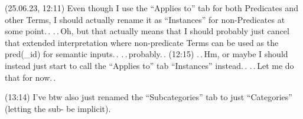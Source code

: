 \documentclass{report}
\begin{document}

(25.06.23, 12:11) Even though I use the ``Applies to'' tab for both Predicates and other Terms, I should actually rename it as ``Instances'' for non-Predicates at some point.\,. .\,.\,Oh, but that actually means that I should probably just cancel that extended interpretation where non-predicate Terms can be used as the pred(\_id) for semantic inputs.\,. .\,.\,probably.\,. (12:15) .\,.\,Hm, or maybe I should instead just start to call the ``Applies to'' tab ``Instances'' instead.\,. .\,.\,Let me do that for now.\,.

(13:14) I've btw also just renamed the ``Subcategories'' tab to just ``Categories'' (letting the sub- be implicit).
\end{document}
